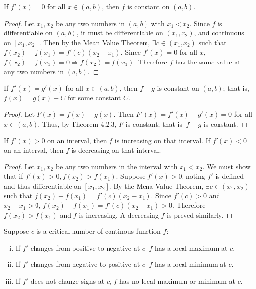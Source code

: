 \documentclass[a4paper,11pt]{article}
\begin{document}
\begin{outline}
    If \(f'(x) = 0\) for all \(x \in (a, b)\), then \(f\) is constant on \((a, b)\).
    
    \begin{proof}
      Let \(x_1, x_2\) be any two numbers in \((a, b)\) with \(x_1 < x_2\). Since \(f\) is differentiable on
      \((a, b)\), it must be differentiable on \((x_1, x_2)\), and continuous on \([x_1, x_2]\). Then by
      the Mean Value Theorem, \(\exists c \in (x_1, x_2)\) such that \(f(x_2)-f(x_1) = f'(c)(x_2-x_1)\).
      Since \(f'(x) = 0\) for all \(x\), \(f(x_2) - f(x_1) = 0 \Rightarrow f(x_2) = f(x_1)\). Therefore
      \(f\) has the same value at any two numbers in \((a, b)\).
    \end{proof}
    
    If \(f'(x) = g'(x)\) for all \(x \in (a, b)\), then \(f-g\) is constant on \((a, b)\); that is, \(f(x)=g(x)+C\)
    for some constant \(C\).
    
    \begin{proof}
      Let \(F(x) = f(x)-g(x)\). Then \(F'(x) = f'(x)-g'(x) = 0\) for all \(x \in (a, b)\). Thus, by Theorem 4.2.3,
      \(F\) is constant; that is, \(f-g\) is constant.
    \end{proof} 
    
    If \(f'(x) > 0\) on an interval, then \(f\) is increasing on that interval. If \(f'(x) < 0\) on an interval,
    then \(f\) is decreasing on that interval.
    
    \begin{proof}
      Let \(x_1, x_2\) be any two numbers in the interval with \(x_1 < x_2\). We must show that if \(f'(x) > 0,
      f(x_2) > f(x_1)\). Suppose \(f'(x) > 0\), noting \(f'\) is defined and thus differentiable on \([x_1, x_2]\).
      By the Mena Value Theorem, \(\exists c \in (x_1, x_2)\) such that \(f(x_2)-f(x_1)=f'(c)(x_2-x_1)\). Since 
      \(f'(c) > 0\) and \(x_2-x_1 > 0\), \(f(x_2)-f(x_1) = f'(c)(x_2-x_1) > 0\). Therefore \(f(x_2) > f(x_1)\)
      and \(f\) is increasing. A decreasing \(f\) is proved similarly.
    \end{proof}
    
    Suppose \(c\) is a critical number of continous function \(f\):
    \begin{enumerate}[i.]
      \item If \(f'\) changes from positive to negative at \(c\), \(f\) has a local maximum at \(c\).
      \item If \(f'\) changes from negative to positive at \(c\), \(f\) has a local minimum at \(c\).
      \item If \(f'\) does not change signs at \(c\), \(f\) has no local maximum or minimum at \(c\).
    \end{enumerate}
    

\end{outline}
\end{document}
